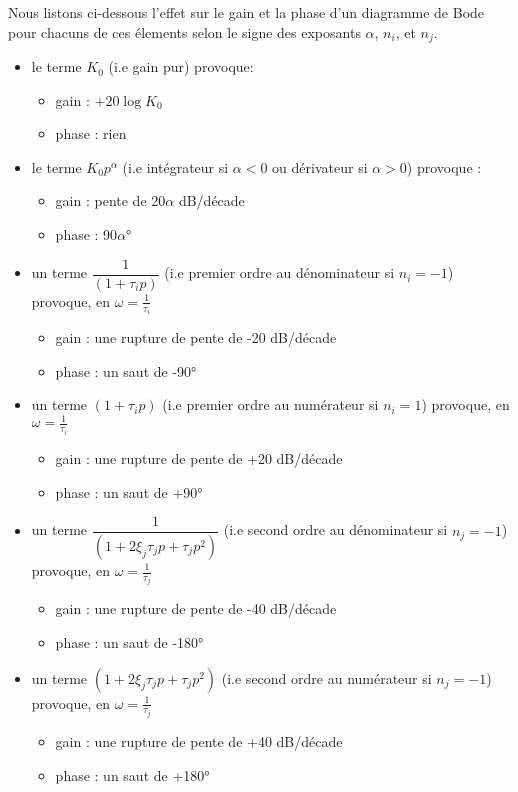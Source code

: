 Nous listons ci-dessous l'effet sur le gain et la phase d'un diagramme de 
Bode pour chacuns de ces élements selon le signe des exposants $\alpha$, 
$n_i$, et $n_j$.
\begin{itemize}
    \item le terme $K_0$ (i.e gain pur) provoque:
    \begin{itemize}
        \item gain  : $+20\log{K_0}$
        \item phase : rien 
    \end{itemize}
    \item le terme $K_0p^{\alpha}$ (i.e intégrateur si $\alpha<0$ ou 
          dérivateur si $\alpha>0$) provoque :
        \begin{itemize}
            \item gain  : pente de 20$\alpha$ dB/décade 
            \item phase : 90$\alpha$\si{\degree}
        \end{itemize}
    \item un terme $\dfrac{1}{(1+\tau_ip)}$ (i.e premier ordre au 
          dénominateur si $n_i=-1$) provoque, en $\omega=\frac{1}{\tau_i}$
        \begin{itemize}
            \item gain  : une rupture de pente de -20 dB/décade 
            \item phase : un saut de -90\si{\degree}
        \end{itemize}
    \item un terme $(1+\tau_ip)$ (i.e premier ordre au numérateur si $n_i=1$) 
          provoque, en $\omega=\frac{1}{\tau_i}$
        \begin{itemize}
            \item gain  : une rupture de pente de +20 dB/décade 
            \item phase : un saut de +90\si{\degree}
        \end{itemize}
    \item un terme $\dfrac{1}{(1+2\xi_j\tau_jp+\tau_jp^2)}$ 
          (i.e second ordre au dénominateur si $n_j=-1$) provoque, 
          en $\omega=\frac{1}{\tau_j}$
        \begin{itemize}
            \item gain  : une rupture de pente de -40 dB/décade 
            \item phase : un saut de -180\si{\degree}
        \end{itemize}
    \item un terme $(1+2\xi_j\tau_jp+\tau_jp^2)$ (i.e second ordre au 
          numérateur si $n_j=-1$) provoque, en $\omega=\frac{1}{\tau_j}$
        \begin{itemize}
            \item gain  : une rupture de pente de +40 dB/décade 
            \item phase : un saut de +180\si{\degree}
        \end{itemize}
\end{itemize}
